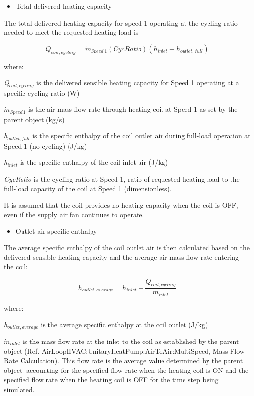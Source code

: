 \begin{itemize}
  \item Total delivered heating capacity
\end{itemize}

The total delivered heating capacity for speed 1 operating at the cycling ratio needed to meet the requested heating load is:

\begin{equation}
{Q_{coil,cycling}} = {\dot{m}_{Speed~1}}\left( {CycRatio} \right)({h_{inlet}} - {h_{outlet,full}})
\end{equation}

where:

\emph{Q\(_{coil,cycling}\)} is the delivered sensible heating capacity for Speed 1 operating at a specific cycling ratio (W)

\(\dot{m}_{Speed~1}\) is the air mass flow rate through heating coil at Speed 1 as set by the parent object (kg/s)

\emph{h\(_{outlet,full}\)} is the specific enthalpy of the coil outlet air during full-load operation at Speed 1 (no cycling) (J/kg)

\emph{h\(_{inlet}\)} is the specific enthalpy of the coil inlet air (J/kg)

\emph{CycRatio} is the cycling ratio at Speed 1, ratio of requested heating load to the full-load capacity of the coil at Speed 1 (dimensionless).

It is assumed that the coil provides no heating capacity when the coil is OFF, even if the supply air fan continues to operate.

\begin{itemize}
  \item Outlet air specific enthalpy
\end{itemize}

The average specific enthalpy of the coil outlet air is then calculated based on the delivered sensible heating capacity and the average air mass flow rate entering the coil:

\begin{equation}
  h_{outlet,average} = h_{inlet} - \frac{Q_{coil,cycling}}{\dot{m}_{inlet}}
\end{equation}

where:

\emph{h\(_{outlet,average}\)} is the average specific enthalpy at the coil outlet (J/kg)

\({\dot m_{inlet}}\) is the mass flow rate at the inlet to the coil as established by the parent object (Ref. AirLoopHVAC:UnitaryHeatPump:AirToAir:MultiSpeed, Mass Flow Rate Calculation). This flow rate is the average value determined by the parent object, accounting for the specified flow rate when the heating coil is ON and the specified flow rate when the heating coil is OFF for the time step being simulated.

